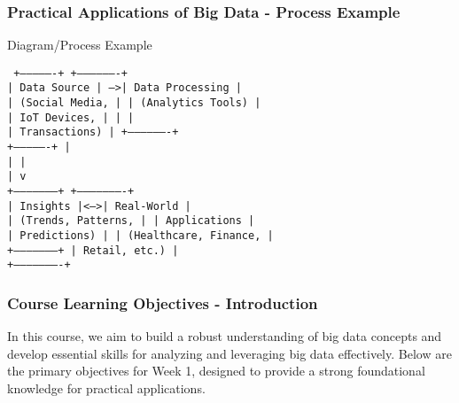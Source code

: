 \documentclass[aspectratio=169]{beamer}
\begin{document}
\begin{frame}[fragile]
    \frametitle{Practical Applications of Big Data - Process Example}
    \begin{block}{Diagram/Process Example}
        \begin{center}
        \texttt{
        +----------------+    +-------------------+\\
        |   Data Source  | -->|    Data Processing |\\
        | (Social Media, |    |  (Analytics Tools) |\\
        |  IoT Devices,  |    |                   |\\
        |  Transactions)  |    +-------------------+\\
        +----------------+            |\\
              |                       |\\
              |                       v\\
          +--------------------+    +----------------------+\\
          |    Insights        |<-->|    Real-World        |\\
          | (Trends, Patterns, |    |    Applications       |\\
          |  Predictions)      |    | (Healthcare, Finance, |\\
          +--------------------+    |  Retail, etc.)       |\\
                                    +----------------------+\\
        }
        \end{center}
    \end{block}
\end{frame}

\begin{frame}[fragile]
    \frametitle{Course Learning Objectives - Introduction}
    In this course, we aim to build a robust understanding of big data concepts and develop essential skills for analyzing and leveraging big data effectively. Below are the primary objectives for Week 1, designed to provide a strong foundational knowledge for practical applications.
\end{frame}
\end{document}
